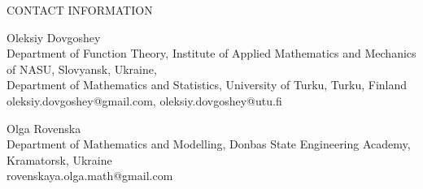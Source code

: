 \documentclass[11pt]{article}
\theoremstyle{definition}
\theoremstyle{remark}
\numberwithin{equation}{section}
\begin{document}











\bigskip

CONTACT INFORMATION

\medskip
Oleksiy Dovgoshey\\
Department of Function Theory, Institute of Applied Mathematics and Mechanics of NASU, Slovyansk, Ukraine,\\
Department of Mathematics and Statistics, University of Turku, Turku, Finland \\
oleksiy.dovgoshey@gmail.com, oleksiy.dovgoshey@utu.fi


\medskip
Olga Rovenska\\
Department of Mathematics and Modelling, Donbas State Engineering Academy, Kramatorsk, Ukraine\\
rovenskaya.olga.math@gmail.com
\end{document}
